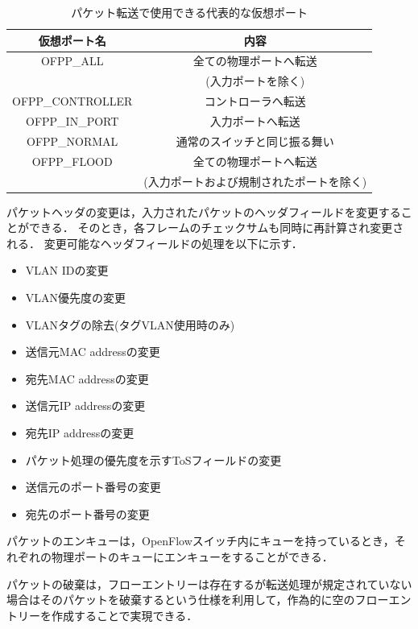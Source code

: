 
\begin{table}[tb]
	\begin{center}
		\caption{パケット転送で使用できる代表的な仮想ポート}
		\begin{tabular}{c|c}
			\hline \hline
			仮想ポート名 & 内容　\\ \hline
			OFPP\_ALL & 全ての物理ポートへ転送　\\
			　& (入力ポートを除く)　\\
			OFPP\_CONTROLLER & コントローラへ転送 \\
			OFPP\_IN\_PORT & 入力ポートへ転送　\\
			OFPP\_NORMAL & 通常のスイッチと同じ振る舞い　\\
			OFPP\_FLOOD & 全ての物理ポートへ転送　\\
			 & (入力ポートおよび規制されたポートを除く) \\ \hline
		\end{tabular}
		\label{tab:2-2}
	\end{center}
\end{table}

パケットヘッダの変更は，入力されたパケットのヘッダフィールドを変更することができる．
そのとき，各フレームのチェックサムも同時に再計算され変更される．
変更可能なヘッダフィールドの処理を以下に示す．

\begin{itemize}
	\item VLAN IDの変更
	\item VLAN優先度の変更
	\item VLANタグの除去(タグVLAN使用時のみ)
	\item 送信元MAC addressの変更
	\item 宛先MAC addressの変更
	\item 送信元IP addressの変更
	\item 宛先IP addressの変更
	\item パケット処理の優先度を示すToSフィールドの変更
	\item 送信元のポート番号の変更
	\item 宛先のポート番号の変更
\end{itemize}

パケットのエンキューは，OpenFlowスイッチ内にキューを持っているとき，それぞれの物理ポートのキューにエンキューをすることができる．

パケットの破棄は，フローエントリーは存在するが転送処理が規定されていない場合はそのパケットを破棄するという仕様を利用して，作為的に空のフローエントリーを作成することで実現できる．

